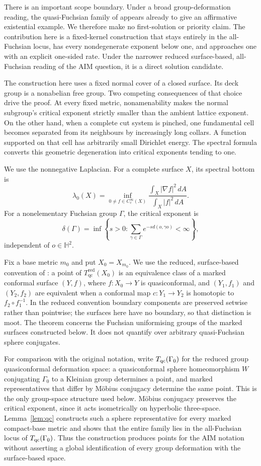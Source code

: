 \documentclass[11pt]{article}
\theoremstyle{definition}
\newcommand{\Hh}{\mathbb H^2}
\newcommand{\Tqcred}{T_{\mathrm{qc}}^{\mathrm{red}}}
\newcommand{\lamzero}{\lambda_0}
\begin{document}
There is an important scope boundary.  Under a broad group-deformation reading,
the quasi-Fuchsian family of \citet{AstalaZinsmeister1995} appears already to
give an affirmative existential example.  We therefore make no first-solution
or priority claim.  The contribution here is a fixed-kernel construction that
stays entirely in the all-Fuchsian locus, has every nondegenerate exponent below
one, and approaches one with an explicit one-sided rate.  Under the narrower
reduced surface-based, all-Fuchsian reading of the AIM question, it is a direct
solution candidate.

The construction here uses a fixed normal cover of a closed surface.  Its deck
group is a nonabelian free group.  Two competing consequences of that choice
drive the proof.  At every fixed metric, nonamenability makes the normal
subgroup's critical exponent strictly smaller than the ambient lattice
exponent.  On the other hand, when a complete cut system is pinched, one
fundamental cell becomes separated from its neighbours by increasingly long
collars.  A function supported on that cell has arbitrarily small Dirichlet
energy.  The spectral formula converts this geometric degeneration into
critical exponents tending to one.

We use the nonnegative Laplacian.  For a complete surface $X$, its spectral
bottom is
\[
 \lamzero(X)=\inf_{0\ne f\in C_c^\infty(X)}
 \frac{\int_X |\nabla f|^2\,dA}{\int_X |f|^2\,dA}.
\]
For a nonelementary Fuchsian group $\Gamma$, the critical exponent is
\[
 \delta(\Gamma)=\inf\left\{s>0:
 \sum_{\gamma\in\Gamma}e^{-s d(o,\gamma o)}<\infty\right\},
\]
independent of $o\in\Hh$.

Fix a base metric $m_0$ and put $X_0=X_{m_0}$.  We use the reduced,
surface-based convention of \citet{AlessandriniEtAl2012}: a point of
$\Tqcred(X_0)$ is an equivalence class of a marked conformal surface $(Y,f)$,
where $f:X_0\to Y$ is quasiconformal, and $(Y_1,f_1)$ and $(Y_2,f_2)$ are
equivalent when a conformal map $c:Y_1\to Y_2$ is homotopic to
$f_2\circ f_1^{-1}$.  In the reduced convention boundary components are
preserved setwise rather than pointwise; the surfaces here have no boundary,
so that distinction is moot.  The theorem concerns the Fuchsian uniformising
groups of the marked surfaces constructed below.  It does not quantify over
arbitrary quasi-Fuchsian sphere conjugates.

For comparison with the original notation, write $T_{\rm qc}(\Gamma_0)$ for
the reduced group quasiconformal deformation space: a quasiconformal sphere
homeomorphism $W$ conjugating $\Gamma_0$ to a Kleinian group determines a
point, and marked representatives that differ by M\"obius conjugacy determine
the same point.  This is the only group-space structure used below.  M\"obius
conjugacy preserves the critical exponent, since it acts isometrically on
hyperbolic three-space.  Lemma~\ref{lem:qc} constructs such a sphere
representative for every marked compact-base metric and shows that the entire
family lies in the all-Fuchsian locus of $T_{\rm qc}(\Gamma_0)$.  Thus the
construction produces points for the AIM notation without asserting a global
identification of every group deformation with the surface-based space.
\end{document}
